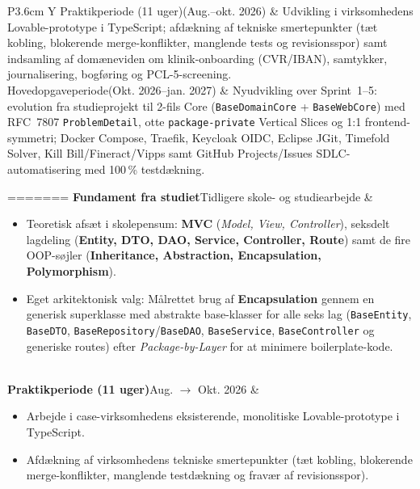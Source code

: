 \documentclass[11pt,a4paper]{article}
\begin{document}
\begin{table}[htbp]
\begin{table}[H]
\begin{tabularx}{\textwidth}{P{3.6cm} Y}
\addlinespace
Praktikperiode (11 uger)\newline (Aug.--okt. 2026) & Udvikling i virksomhedens Lovable-prototype i TypeScript; afdækning af tekniske smertepunkter (tæt kobling, blokerende merge-konflikter, manglende tests og revisionsspor) samt indsamling af domæneviden om klinik-onboarding (CVR/IBAN), samtykker, journalisering, bogføring og PCL-5-screening. \\
\addlinespace
Hovedopgaveperiode\newline (Okt. 2026--jan. 2027) & Nyudvikling over Sprint~1--5: evolution fra studieprojekt til 2-fils Core (\texttt{BaseDomainCore} + \texttt{BaseWebCore}) med RFC~7807 \texttt{ProblemDetail}, otte \texttt{package-private} Vertical Slices og 1:1 frontend-symmetri; Docker Compose, Traefik, Keycloak OIDC, Eclipse JGit, Timefold Solver, Kill Bill/Fineract/Vipps samt GitHub Projects/Issues SDLC-automatisering med 100\,\% testdækning. \\
\bottomrule
\end{tabularx}
\caption{Sammenhæng mellem det generiske Java-studiefundament, praktikopholdet og hovedopgavens fem udviklingssprints.}
\label{tab:projektforloeb}
=======
\textbf{Fundament fra studiet}\newline Tidligere skole- og studiearbejde &
\begin{itemize}[leftmargin=*, nosep, topsep=2pt]
    \item Teoretisk afsæt i skolepensum: \textbf{MVC} (\textit{Model, View, Controller}), seksdelt lagdeling (\textbf{Entity, DTO, DAO, Service, Controller, Route}) samt de fire OOP-søjler (\textbf{Inheritance, Abstraction, Encapsulation, Polymorphism}).
    \item Eget arkitektonisk valg: Målrettet brug af \textbf{Encapsulation} gennem en generisk superklasse med abstrakte base-klasser for alle seks lag (\texttt{BaseEntity}, \texttt{BaseDTO}, \texttt{BaseRepository}/\texttt{BaseDAO}, \texttt{BaseService}, \texttt{BaseController} og generiske routes) efter \textit{Package-by-Layer} for at minimere boilerplate-kode.
\end{itemize} \\
\midrule
\textbf{Praktikperiode (11 uger)}\newline Aug. $\rightarrow$ Okt. 2026 &
\begin{itemize}[leftmargin=*, nosep, topsep=2pt]
    \item Arbejde i case-virksomhedens eksisterende, monolitiske Lovable-prototype i TypeScript.
    \item Afdækning af virksomhedens tekniske smertepunkter (tæt kobling, blokerende merge-konflikter, manglende testdækning og fravær af revisionsspor).

\end{itemize}
\end{table}
\end{table}
\end{document}
